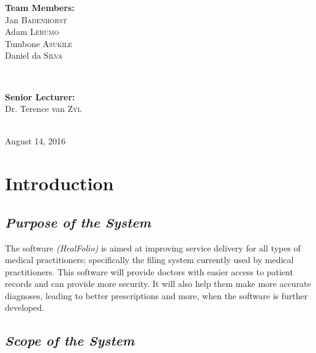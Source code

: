 \documentclass[a4paper]{article}
\begin{document}
\begin{titlepage}
\begin{minipage}{0.4\textwidth}
\begin{flushleft}
\textbf{Team Members:} \\[0.3cm]

Jan \textsc{Badenhorst} \\
Adam \textsc{Lerumo} \\
Tumbone \textsc{Asukile} \\
Daniel da \textsc{Silva} \\

\end{flushleft}

\end{minipage} \\[0.7cm]

\begin{minipage}{0.4\textwidth}

\begin{flushright} \large

\textbf{Senior Lecturer:} \\[0.3cm]

Dr. Terence van \textsc{Zyl} \\

\end{flushright}

\end{minipage} \\[1cm]

{\large August 14, 2016} 
    
\end{titlepage}

\setlength\parindent{24pt}

\newpage

\section{Introduction}

\subsection{\textit{Purpose of the System}}

The software \emph{(HealFolio)} is aimed at improving service delivery for all types of medical practitioners; specifically the filing system currently used by medical practitioners. This software will provide doctors with easier access to patient records and can provide more security. It will also help them make more accurate diagnoses, leading to better prescriptions and more, when the software is further developed. 
		
\subsection{\textit{Scope of the System}}
\end{document}
